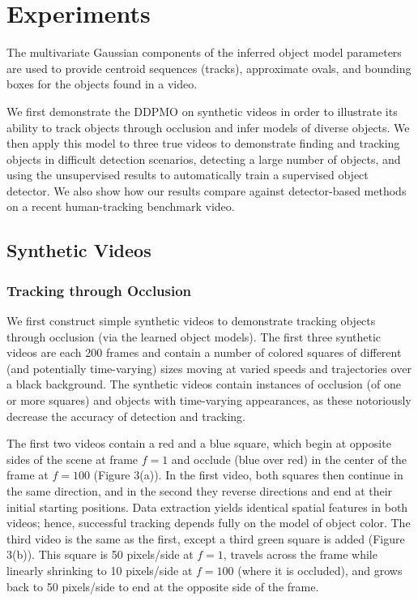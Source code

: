 \documentclass{article}
\begin{document}
\section{Experiments} 
The multivariate Gaussian components of the inferred object model parameters are used to provide centroid sequences (tracks), approximate ovals, and bounding boxes for the objects found in a video.

We first demonstrate the DDPMO on synthetic videos in order to illustrate its ability to track objects through occlusion and infer models of diverse objects. We then apply this model to three true videos to demonstrate finding and tracking objects in difficult detection scenarios, detecting a large number of objects, and using the unsupervised results to automatically train a supervised object detector. We also show how our results compare against detector-based methods on a recent human-tracking benchmark video.


\subsection{Synthetic Videos}

\subsubsection{Tracking through Occlusion}
We first construct simple synthetic videos to demonstrate tracking objects through occlusion (via the learned object models). The first three synthetic videos are each 200 frames and contain a number of colored squares of different (and potentially time-varying) sizes moving at varied speeds and trajectories over a black background. The synthetic videos contain instances of occlusion (of one or more squares) and objects with time-varying appearances, as these notoriously decrease the accuracy of detection and tracking.

The first two videos contain a red and a blue square, which begin at opposite sides of the scene at frame $f=1$ and occlude (blue over red) in the center of the frame at $f=100$ (Figure 3(a)). In the first video, both squares then continue in the same direction, and in the second they reverse directions and end at their initial starting positions. Data extraction yields identical spatial features in both videos; hence, successful tracking depends fully on the model of object color. The third video is the same as the first, except a third green square is added (Figure 3(b)). This square is 50 pixels/side at $f=1$, travels across the frame while linearly shrinking to 10 pixels/side at $f=100$ (where it is occluded), and grows back to 50 pixels/side to end at the opposite side of the frame.
\end{document}
